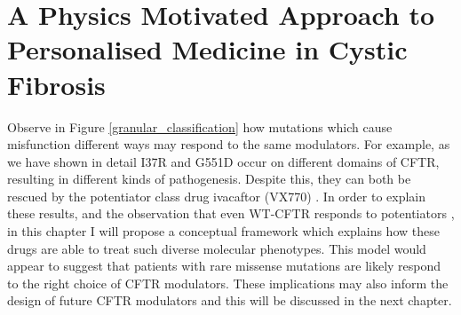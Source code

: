\section{A Physics Motivated Approach to Personalised Medicine in Cystic Fibrosis}
Observe in Figure \ref{granular_classification} how mutations which cause misfunction different ways may respond to the same modulators. For example, as we have shown in detail I37R and G551D occur on different domains of CFTR, resulting in different kinds of pathogenesis. Despite this, they can both be rescued by the potentiator class drug ivacaftor (VX770) \cite{vangoor2014,wong2022}. In order to explain these results, and the observation that even WT-CFTR responds to potentiators \cite{csnady2019}, in this chapter I will propose a conceptual framework which explains how these drugs are able to treat such diverse molecular phenotypes. This model would appear to suggest that patients with rare missense mutations are likely respond to the right choice of CFTR modulators. These implications may also inform the design of future CFTR modulators and this will be discussed in the next chapter. 

